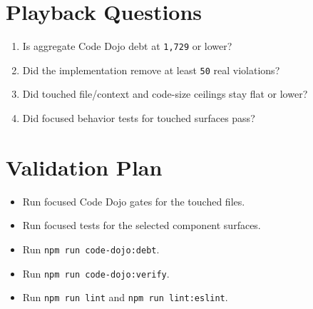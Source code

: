 \section{Playback Questions}\label{record-222-playback-questions}

\begin{enumerate}
\def\labelenumi{\arabic{enumi}.}
\tightlist
\item
  Is aggregate Code Dojo debt at \texttt{1\allowbreak{},\allowbreak{}7\allowbreak{}2\allowbreak{}9} or lower?
\item
  Did the implementation remove at least \texttt{5\allowbreak{}0} real violations?
\item
  Did touched file/context and code-size ceilings stay flat or lower?
\item
  Did focused behavior tests for touched surfaces pass?
\end{enumerate}

\section{Validation Plan}\label{record-222-validation-plan}

\begin{itemize}
\tightlist
\item
  Run focused Code Dojo gates for the touched files.
\item
  Run focused tests for the selected component surfaces.
\item
  Run \texttt{n\allowbreak{}p\allowbreak{}m\allowbreak{} \allowbreak{}r\allowbreak{}u\allowbreak{}n\allowbreak{} \allowbreak{}c\allowbreak{}o\allowbreak{}d\allowbreak{}e\allowbreak{}-\allowbreak{}d\allowbreak{}o\allowbreak{}j\allowbreak{}o\allowbreak{}:\allowbreak{}d\allowbreak{}e\allowbreak{}b\allowbreak{}t}.
\item
  Run \texttt{n\allowbreak{}p\allowbreak{}m\allowbreak{} \allowbreak{}r\allowbreak{}u\allowbreak{}n\allowbreak{} \allowbreak{}c\allowbreak{}o\allowbreak{}d\allowbreak{}e\allowbreak{}-\allowbreak{}d\allowbreak{}o\allowbreak{}j\allowbreak{}o\allowbreak{}:\allowbreak{}v\allowbreak{}e\allowbreak{}r\allowbreak{}i\allowbreak{}f\allowbreak{}y}.
\item
  Run \texttt{n\allowbreak{}p\allowbreak{}m\allowbreak{} \allowbreak{}r\allowbreak{}u\allowbreak{}n\allowbreak{} \allowbreak{}l\allowbreak{}i\allowbreak{}n\allowbreak{}t} and \texttt{n\allowbreak{}p\allowbreak{}m\allowbreak{} \allowbreak{}r\allowbreak{}u\allowbreak{}n\allowbreak{} \allowbreak{}l\allowbreak{}i\allowbreak{}n\allowbreak{}t\allowbreak{}:\allowbreak{}e\allowbreak{}s\allowbreak{}l\allowbreak{}i\allowbreak{}n\allowbreak{}t}.
\end{itemize}

